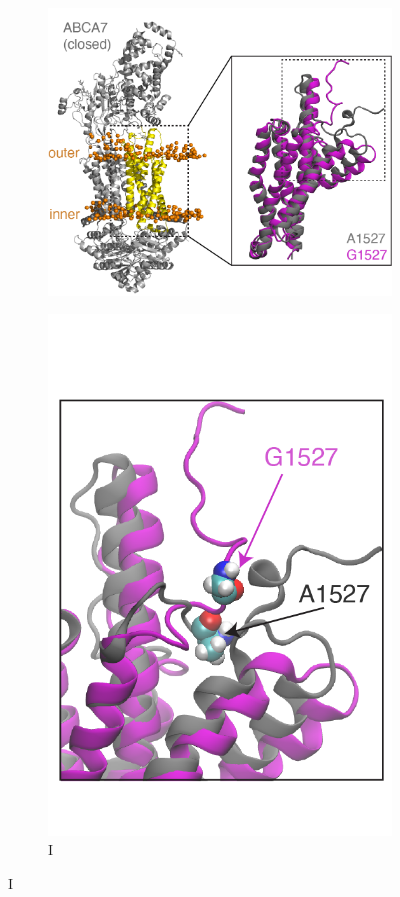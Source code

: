 \begin{figure}[H]
\begin{subfigure}[t]{0.3\textwidth}
        \includegraphics[width=\textwidth]{./main_plots/abca7_structure_with_inset.png}        
    \end{subfigure}
    \begin{subfigure}[t]{0.165\textwidth}
        \caption{I}
        \includegraphics[width=\textwidth]{./main_plots/abca7_inset_only.png}        

\end{subfigure}
\end{figure}
